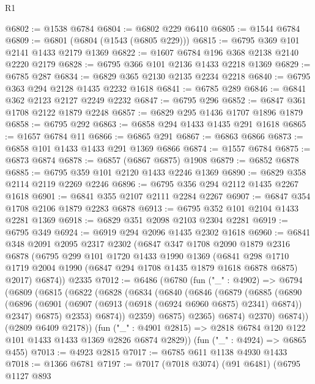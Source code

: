\begin{lexlean}{R1}
\begin{coremodule}
@6802 := @1538 @6784
@6804 := @6802 @229 @6410
@6805 := @1544 @6784
@6809 := @6801 (@6804 (@1543 (@6805 @229)))
@6815 := @6795 @369 @101 @2141 @1433 @2179 @1369
@6822 := @1607 @6784 @196 @368 @2138 @2140 @2220 @2179
@6828 := @6795 @366 @101 @2136 @1433 @2218 @1369
@6829 := @6785 @287
@6834 := @6829 @365 @2130 @2135 @2234 @2218
@6840 := @6795 @363 @294 @2128 @1435 @2232 @1618
@6841 := @6785 @289
@6846 := @6841 @362 @2123 @2127 @2249 @2232
@6847 := @6795 @296
@6852 := @6847 @361 @1708 @2122 @1879 @2248
@6857 := @6829 @295 @1436 @1707 @1896 @1879
@6858 := @6795 @292
@6863 := @6858 @294 @1433 @1435 @291 @1618
@6865 := @1657 @6784 @11
@6866 := @6865 @291
@6867 := @6863 @6866
@6873 := @6858 @101 @1433 @1433 @291 @1369 @6866
@6874 := @1557 @6784
@6875 := @6873 @6874
@6878 := @6857 (@6867 @6875) @1908
@6879 := @6852 @6878
@6885 := @6795 @359 @101 @2120 @1433 @2246 @1369
@6890 := @6829 @358 @2114 @2119 @2269 @2246
@6896 := @6795 @356 @294 @2112 @1435 @2267 @1618
@6901 := @6841 @355 @2107 @2111 @2284 @2267
@6907 := @6847 @354 @1708 @2106 @1879 @2283 @6878
@6913 := @6795 @352 @101 @2104 @1433 @2281 @1369
@6918 := @6829 @351 @2098 @2103 @2304 @2281
@6919 := @6795 @349
@6924 := @6919 @294 @2096 @1435 @2302 @1618
@6960 := @6841
    @348
    @2091
    @2095
    @2317
    @2302
    (@6847
      @347
      @1708
      @2090
      @1879
      @2316
      @6878
      (@6795
        @299
        @101
        @1720
        @1433
        @1990
        @1369
        (@6841 @298 @1710 @1719 @2004 @1990 (@6847 @294 @1708 @1435 @1879 @1618 @6878 @6875) @2017)
        @6874))
    @2335
@7012 := @6486
    (@6780
      (fun ("_" : @4902) =>
      @6794
        (@6809
          (@6815
            (@6822
              (@6828
                (@6834
                  (@6840
                    (@6846
                      (@6879
                        (@6885
                          (@6890
                            (@6896
                              (@6901 (@6907 (@6913 (@6918 (@6924 @6960 @6875) @2341) @6874)) @2347)
                              @6875)
                            @2353)
                          @6874))
                      @2359)
                    @6875)
                  @2365)
                @6874)
              @2370)
            @6874))
        (@2809 @6409 @2178))
      (fun ("_" : @4901 @2815) => @2818 @6784 @120 @122 @101 @1433 @1433 @1369 @2826 @6874 @2829))
    (fun ("_" : @4924) => @6865 @455)
@7013 := @4923 @2815
@7017 := @6785 @611 @1138 @4930 @1433
@7018 := @1366 @6781
@7197 := @7017
    (@7018 @3074)
    (@91 @6481)
    (@6795
      @1127
      @893

\end{coremodule}
\end{lexlean}

